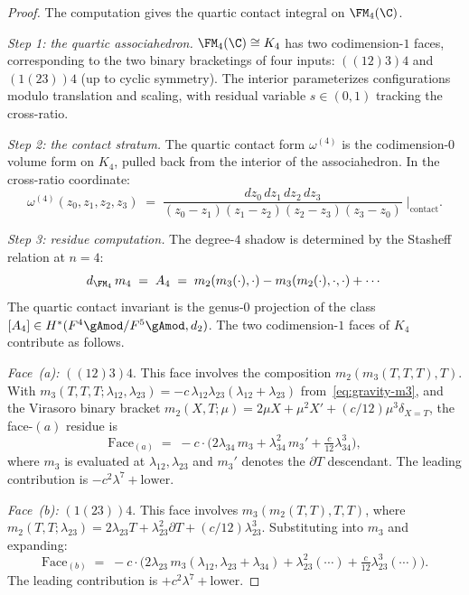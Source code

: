 \begin{proof}
The computation gives the quartic contact integral on $\FM_4(\C)$.

\emph{Step 1: the quartic associahedron.}
$\FM_4(\C) \cong K_4$ has two codimension-$1$ faces,
corresponding to the two binary bracketings of four inputs:
$((12)3)4$ and $(1(23))4$ (up to cyclic symmetry).
The interior parameterizes configurations modulo
translation and scaling, with residual variable
$s \in (0,1)$ tracking the cross-ratio.

\emph{Step 2: the contact stratum.}
The quartic contact form $\omega^{(4)}$ is the codimension-$0$
volume form on $K_4$, pulled back from the interior of the
associahedron. In the cross-ratio coordinate:
\[
\omega^{(4)}(z_0, z_1, z_2, z_3)
\;=\;
\frac{dz_0\,dz_1\,dz_2\,dz_3}
 {(z_0-z_1)(z_1-z_2)(z_2-z_3)(z_3-z_0)}
\;\Big|_{\mathrm{contact}}.
\]

\emph{Step 3: residue computation.}
The degree-$4$ shadow is determined by the Stasheff relation at
$n = 4$:
\[
d_{\FM_4}\,m_4
\;=\;
A_4
\;=\;
m_2(m_3(\cdot), \cdot) - m_3(m_2(\cdot), \cdot, \cdot) + \cdots
\]
The quartic contact invariant is the genus-$0$ projection of the
class $[A_4] \in H^*(F^4\gAmod/F^5\gAmod, d_2)$.
The two codimension-$1$ faces of $K_4$ contribute as follows.

\emph{Face~(a):} $((12)3)4$. This face involves the composition
$m_2(m_3(T,T,T),T)$. With
$m_3(T,T,T;\lambda_{12},\lambda_{23})
= -c\,\lambda_{12}\lambda_{23}(\lambda_{12}+\lambda_{23})$
from~\eqref{eq:gravity-m3}, and the Virasoro binary bracket
$m_2(X,T;\mu) = 2\mu X + \mu^2 X' + (c/12)\mu^3\delta_{X=T}$,
the face-$(a)$ residue is
\[
\text{Face}_{(a)}
\;=\;
-c \cdot
\bigl(
 2\lambda_{34}\,m_3 + \lambda_{34}^2\,m_3'
 + \tfrac{c}{12}\lambda_{34}^3
\bigr),
\]
where $m_3$ is evaluated at $\lambda_{12}, \lambda_{23}$
and $m_3'$ denotes the $\partial T$ descendant. The leading
contribution is $-c^2\lambda^7 + \text{lower}$.

\emph{Face~(b):} $(1(23))4$. This face involves
$m_3(m_2(T,T),T,T)$, where $m_2(T,T;\lambda_{23})
= 2\lambda_{23}T + \lambda_{23}^2\partial T
+ (c/12)\lambda_{23}^3$. Substituting into $m_3$ and
expanding:
\[
\text{Face}_{(b)}
\;=\;
-c \cdot
\bigl(
 2\lambda_{23}\,m_3(\lambda_{12}, \lambda_{23}+\lambda_{34})
 + \lambda_{23}^2(\cdots)
 + \tfrac{c}{12}\lambda_{23}^3(\cdots)
\bigr).
\]
The leading contribution is $+c^2\lambda^7 + \text{lower}$.


\end{proof}

